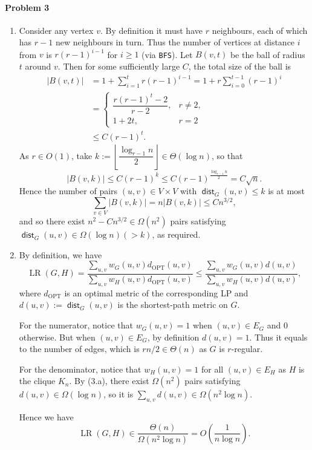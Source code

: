 \documentclass[12pt]{article}
\DeclareMathOperator{\LR}{LR}
\DeclareMathOperator{\OPT}{OPT}
\DeclareMathOperator{\dist}{\mathsf{dist}}
\begin{document}
\paragraph{Problem 3}
\begin{enumerate}[label=\alph*., font=\bfseries]
\item
Consider any vertex $v$. By definition it must have $r$ neighbours, each of which has $r-1$ new neighbours in turn. Thus the number of vertices at distance $i$ from $v$ is $r(r-1)^{i-1}$ for $i\ge1$ (via \texttt{BFS}). Let $B(v,t)$ be the ball of radius $t$ around $v$. Then for some sufficiently large $C$, the total size of the ball is
\begin{align*}
|B(v, t)| &= 1+\sum_{i=1}^{t}r(r-1)^{i-1}=1+r\sum_{i=0}^{t-1}(r-1)^i\\
&=\begin{cases}
\dfrac{r(r-1)^t-2}{r-2},&r\neq 2,\\
1+2t,&r=2
\end{cases}\\
&\le C(r-1)^t.
\end{align*}
As $r\in O(1)$, take $k:=\left\lfloor\dfrac{\log_{r-1}n}{2}\right\rfloor\in\Theta(\log n)$, so that
\[|B(v,k)|\le C(r-1)^k\le C(r-1)^{\frac{\log_{r-1}n}{2}}=C\sqrt n.\]
Hence the number of pairs $(u,v)\in V\times V$ with $\dist_G(u,v)\le k$ is at most
$$\sum_{v\in V}|B(v,k)|=n|B(v,k)|\le Cn^{3/2},$$
and so there exist $n^2-Cn^{3/2}\in\Omega(n^2)$ pairs satisfying $\dist_G(u,v)\in\Omega(\log n)(>k)$, as required.
\item
By definition, we have
$$\LR(G,H)=\dfrac{\sum_{u,v}w_G(u,v)d_{\OPT}(u,v)}{\sum_{u,v}w_H(u,v)d_{\OPT}(u,v)}\le\dfrac{\sum_{u,v}w_G(u,v)d(u,v)}{\sum_{u,v}w_H(u,v)d(u,v)},$$
where $d_{\OPT}$ is an optimal metric of the corresponding LP and $d(u,v):=\dist_G(u,v)$ is the shortest-path metric on $G$.

For the numerator, notice that $w_G(u,v)=1$ when $(u,v)\in E_G$ and $0$ otherwise. But when $(u,v)\in E_G$, by definition $d(u,v)=1$. Thus it equals to the number of edges, which is $rn/2\in\Theta(n)$ as $G$ is $r$-regular.

For the denominator, notice that $w_H(u,v)=1$ for all $(u,v)\in E_H$ as $H$ is the clique $K_n$. By (3.a), there exist $\Omega(n^2)$ pairs satisfying $d(u,v)\in\Omega(\log n)$, so it is $\sum_{u,v}d(u,v)\in \Omega(n^2\log n)$.

Hence we have
\begin{equation}
\LR(G,H)\in\dfrac{\Theta(n)}{\Omega(n^2\log n)}=O\left(\dfrac{1}{n\log n}\right).
\end{equation}


\end{enumerate}
\end{document}

